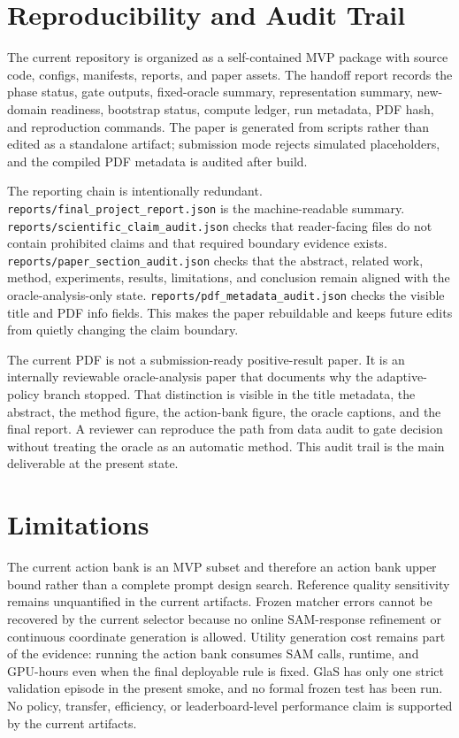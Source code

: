\section{Reproducibility and Audit Trail}
The current repository is organized as a self-contained MVP package with source code, configs, manifests, reports, and paper assets. The handoff report records the phase status, gate outputs, fixed-oracle summary, representation summary, new-domain readiness, bootstrap status, compute ledger, run metadata, PDF hash, and reproduction commands. The paper is generated from scripts rather than edited as a standalone artifact; submission mode rejects simulated placeholders, and the compiled PDF metadata is audited after build.

The reporting chain is intentionally redundant. \texttt{reports/final\_project\_report.json} is the machine-readable summary. \texttt{reports/scientific\_claim\_audit.json} checks that reader-facing files do not contain prohibited claims and that required boundary evidence exists. \texttt{reports/paper\_section\_audit.json} checks that the abstract, related work, method, experiments, results, limitations, and conclusion remain aligned with the oracle-analysis-only state. \texttt{reports/pdf\_metadata\_audit.json} checks the visible title and PDF info fields. This makes the paper rebuildable and keeps future edits from quietly changing the claim boundary.

The current PDF is not a submission-ready positive-result paper. It is an internally reviewable oracle-analysis paper that documents why the adaptive-policy branch stopped. That distinction is visible in the title metadata, the abstract, the method figure, the action-bank figure, the oracle captions, and the final report. A reviewer can reproduce the path from data audit to gate decision without treating the oracle as an automatic method. This audit trail is the main deliverable at the present state.

\section{Limitations}
The current action bank is an MVP subset and therefore an action bank upper bound rather than a complete prompt design search. Reference quality sensitivity remains unquantified in the current artifacts. Frozen matcher errors cannot be recovered by the current selector because no online SAM-response refinement or continuous coordinate generation is allowed. Utility generation cost remains part of the evidence: running the action bank consumes SAM calls, runtime, and GPU-hours even when the final deployable rule is fixed. GlaS has only one strict validation episode in the present smoke, and no formal frozen test has been run. No policy, transfer, efficiency, or leaderboard-level performance claim is supported by the current artifacts.

